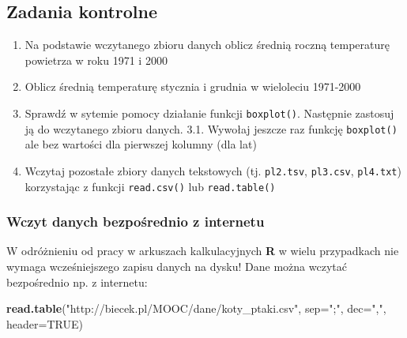 \documentclass[]{book}
\newenvironment{Shaded}{\begin{snugshade}}{\end{snugshade}}
\newcommand{\KeywordTok}[1]{\textcolor[rgb]{0.13,0.29,0.53}{\textbf{#1}}}
\newcommand{\DataTypeTok}[1]{\textcolor[rgb]{0.13,0.29,0.53}{#1}}
\newcommand{\StringTok}[1]{\textcolor[rgb]{0.31,0.60,0.02}{#1}}
\newcommand{\OtherTok}[1]{\textcolor[rgb]{0.56,0.35,0.01}{#1}}
\newcommand{\NormalTok}[1]{#1}
\providecommand{\tightlist}{%
  \setlength{\itemsep}{0pt}\setlength{\parskip}{0pt}}
\theoremstyle{definition}
\theoremstyle{definition}
\theoremstyle{definition}
\theoremstyle{remark}
\begin{document}
\subsection*{Zadania kontrolne}\label{zadania-kontrolne}

\begin{enumerate}
\def\labelenumi{\arabic{enumi}.}
\tightlist
\item
  Na podstawie wczytanego zbioru danych oblicz średnią roczną
  temperaturę powietrza w roku 1971 i 2000
\item
  Oblicz średnią temperaturę stycznia i grudnia w wieloleciu 1971-2000
\item
  Sprawdź w sytemie pomocy działanie funkcji \texttt{boxplot()}.
  Następnie zastosuj ją do wczytanego zbioru danych. 3.1. Wywołaj
  jeszcze raz funkcję \texttt{boxplot()} ale bez wartości dla pierwszej
  kolumny (dla lat)
\item
  Wczytaj pozostałe zbiory danych tekstowych (tj. \texttt{pl2.tsv},
  \texttt{pl3.csv}, \texttt{pl4.txt}) korzystając z funkcji
  \texttt{read.csv()} lub \texttt{read.table()}
\end{enumerate}

\subsubsection{Wczyt danych bezpośrednio z
internetu}\label{wczyt-danych-bezposrednio-z-internetu}

W odróżnieniu od pracy w arkuszach kalkulacyjnych \textbf{R} w wielu
przypadkach nie wymaga wcześniejszego zapisu danych na dysku! Dane można
wczytać bezpośrednio np. z internetu:

\begin{Shaded}
\begin{Highlighting}[]
\KeywordTok{read.table}\NormalTok{(}\StringTok{"http://biecek.pl/MOOC/dane/koty_ptaki.csv"}\NormalTok{, }\DataTypeTok{sep=}\StringTok{";"}\NormalTok{, }\DataTypeTok{dec=}\StringTok{","}\NormalTok{, }\DataTypeTok{header=}\OtherTok{TRUE}\NormalTok{)}
\end{Highlighting}
\end{Shaded}
\end{document}
